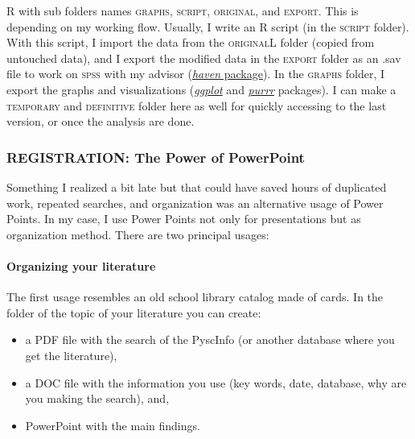 \documentclass{article}
\begin{document}
R with sub folders names \textsc{graphs, script, original}, and \textsc{export}. This is depending on my working flow. Usually, I write an R script (in the \textsc{script} folder). With this script, I import the data from the \textsc{original}L folder (copied from untouched data), and I export the modified data in the \textsc{export} folder as an .sav file to work on \textsc{spss} with my advisor (\href{https://www.rdocumentation.org/packages/haven/versions/2.2.0}{\emph{haven} package}). In the \textsc{graphs} folder, I export the graphs and visualizations (\href{https://ggplot2.tidyverse.org/}{\emph{ggplot}}\citep{wickham2007ggplot} and \href{https://purrr.tidyverse.org/}{\emph{purrr}}\citep{henry2017purrr} packages). I can make a \textsc{temporary} and \textsc{definitive} folder here as well for quickly accessing to the last version, or once the analysis are done.

\subsubsection{REGISTRATION: The Power of PowerPoint}
\label{subsubsec: Registr}
Something I realized a bit late but that could have saved hours of duplicated work, repeated searches, and organization was an alternative usage of Power Points. In my case, I use Power Points not only for presentations but as organization method. There are two principal usages: 

\paragraph{Organizing your literature}
\label{parag: literat}
The first usage resembles an old school library catalog made of cards. In the folder of the topic of your literature you can create:
\begin{itemize}
    \item a PDF file with the search of the PyscInfo (or another database where you get the literature), 
    \item a DOC file with the information you use (key words, date, database, why are you making the search), and,
    \item PowerPoint with the main findings. 
\end{itemize}
\end{document}
